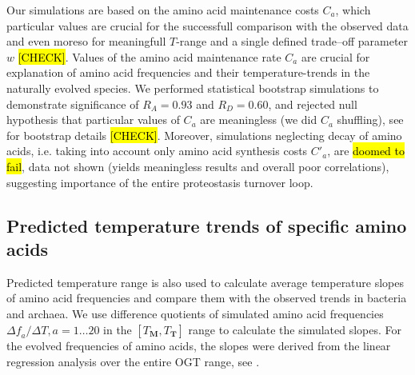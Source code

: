 \documentclass[10pt,letterpaper]{article}
\begin{document}
Our simulations are based on the amino acid maintenance costs $C_{a}$, which particular values are crucial for the successfull comparison with the observed data and even moreso for meaningfull $T$-range and a single defined trade--off parameter $w$ \hl{[CHECK]}. Values of the amino acid maintenance rate $C_{a}$ are crucial for explanation of amino acid frequencies and their temperature-trends in the naturally evolved species. We performed statistical bootstrap simulations to demonstrate significance of $R_A=0.93$ and $R_D=0.60$, and rejected null hypothesis that particular values of $C_{a}$ are meaningless (we did $C_{a}$ shuffling), see  for bootstrap details \hl{[CHECK]}. Moreover, simulations neglecting decay of amino acids, i.e. taking into account only amino acid synthesis costs $C'_{a}$, are \hl{doomed to fail}, data not shown (yields meaningless results and overall poor correlations), suggesting importance of the entire proteostasis turnover loop.
 

\subsection*{Predicted temperature trends of specific amino acids}
    
Predicted temperature range is also used to calculate average temperature slopes of amino acid frequencies and compare them with the observed trends in bacteria and archaea. We use difference quotients of simulated amino acid frequencies $\Delta\mathit{f}_{a}/\Delta T, a=1\dots20$ in the $[T_{\mathbf{M}},T_{\mathbf{T}}]$ range to calculate the simulated slopes. For the evolved frequencies of amino acids, the slopes were derived from the  linear regression analysis over the entire OGT range, see .
\end{document}
